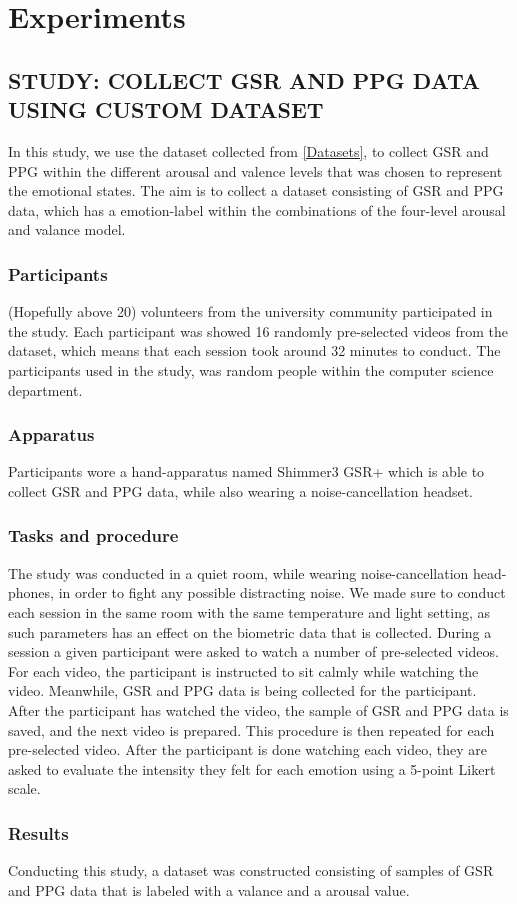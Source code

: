 \chapter{Experiments}

\section{STUDY: COLLECT GSR AND PPG DATA USING CUSTOM DATASET}
In this study, we use the dataset collected from \cref{Datasets}, to collect GSR and PPG within the different arousal and valence levels that was chosen to represent the emotional states. The aim is to collect a dataset consisting of GSR and PPG data, which has a emotion-label within the combinations of the four-level arousal and valance model.

\subsection{Participants}
(Hopefully above 20) volunteers from the university community participated in the study. Each participant was showed 16 randomly pre-selected videos from the dataset, which means that each session took around 32 minutes to conduct. The participants used in the study, was random people within the computer science department.

\subsection{Apparatus}
Participants wore a hand-apparatus named Shimmer3 GSR+ which is able to collect GSR and PPG data, while also wearing a noise-cancellation headset.  

\subsection{Tasks and procedure}
The study was conducted in a quiet room, while wearing noise-cancellation head-phones, in order to fight any possible distracting noise. We made sure to conduct each session in the same room with the same temperature and light setting, as such parameters has an effect on the biometric data that is collected.
During a session a given participant were asked to watch a number of pre-selected  videos. For each video, the participant is instructed to sit calmly while watching the video. Meanwhile, GSR and PPG data is being collected for the participant. After the participant has watched the video, the sample of GSR and PPG data is saved, and the next video is prepared. This procedure is then repeated for each pre-selected video. 
After the participant is done watching each video, they are asked to evaluate the intensity they felt for each emotion using a 5-point Likert scale.

\subsection{Results}
Conducting this study, a dataset was constructed consisting of samples of GSR and PPG data that is labeled with a valance and a arousal value.